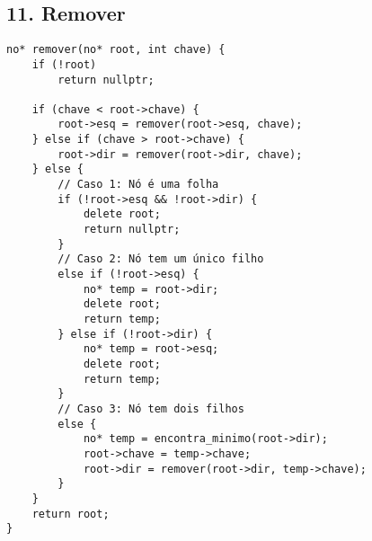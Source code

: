 \documentclass[a4paper,12pt]{article}
\begin{document}
\subsection*{11. Remover}
\begin{verbatim}
no* remover(no* root, int chave) {
    if (!root)
        return nullptr;

    if (chave < root->chave) {
        root->esq = remover(root->esq, chave);
    } else if (chave > root->chave) {
        root->dir = remover(root->dir, chave);
    } else {
        // Caso 1: Nó é uma folha
        if (!root->esq && !root->dir) {
            delete root;
            return nullptr;
        }
        // Caso 2: Nó tem um único filho
        else if (!root->esq) {
            no* temp = root->dir;
            delete root;
            return temp;
        } else if (!root->dir) {
            no* temp = root->esq;
            delete root;
            return temp;
        }
        // Caso 3: Nó tem dois filhos
        else {
            no* temp = encontra_minimo(root->dir);
            root->chave = temp->chave;
            root->dir = remover(root->dir, temp->chave);
        }
    }
    return root;
}
\end{verbatim}
\end{document}
